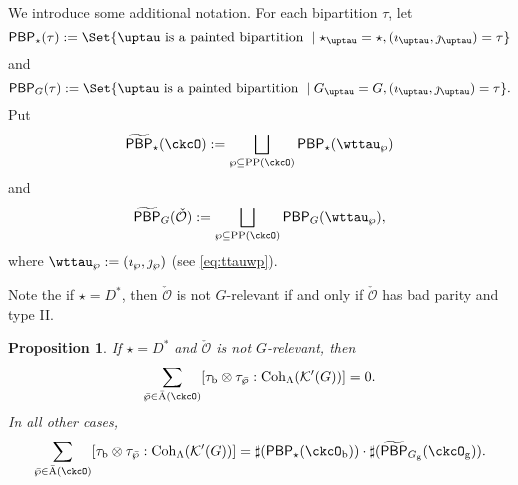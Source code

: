 \documentclass[12pt,a4paper]{amsart}
\newcommand{\CK}{{\mathcal {K}}}
\newcommand{\CO}{{\mathcal {O}}}
\numberwithin{equation}{section}
\newtheorem{prop}[thm]{Proposition}
\theoremstyle{remark}
\def\Unip{\mathrm{Unip}}
\def\LC{{}^{\scriptscriptstyle L}\sC}
\def\Coh{\mathrm{Coh}}
\def\CPP{\mathrm{PP}}
\def\tPBP{\widetilde{\mathsf{PBP}}}
\def\PBP{\mathsf{PBP}}
\def\ckcOg{\ckcO_{\mathrm g}}
\def\nnb{n_{\mathrm b}}
\def\tPBP{\widetilde{\mathsf{PBP}}}
\begin{document}
 We introduce some additional notation. For each bipartition $\tau$, let
\[
  \PBP_{\star}(\tau) := \Set{ \uptau \text{ is a painted bipartition }\mid  \star_{\uptau}=\star, (\imath_{\uptau},\jmath_{\uptau}) = \tau}
\]
and
\[
  \PBP_{G}(\tau) := \Set{\uptau \text{ is a painted bipartition }\mid G_{\uptau}=G, (\imath_{\uptau},\jmath_{\uptau}) = \tau}.
\]
Put
\[
  \tPBP_{\star}(\ckcO) := %
  \bigsqcup_{\wp \subseteq \CPP(\ckcO)}\PBP_{\star}(\wttau_{\wp})
\]
and
\[
  \tPBP_{G}(\check \CO):=   \bigsqcup_{\wp \subseteq \CPP(\ckcO)}\PBP_{G}(\wttau_{\wp}),
 \]
where $\wttau_{\wp} := (\imath_{\wp},\jmath_{\wp})$ (see \eqref{eq:ttauwp}).



Note the if  $\star =D^{*}$, then $\check \CO$ is not $G$-relevant if and only if $\check \CO$ has bad parity and type II.

\begin{prop}\label{prop:countBCD}
 If  $\star =D^{*}$ and $\check \CO$ is not $G$-relevant, then
  \[
  \sum_{\bar \wp\in \bar{\mathrm A}(\ckcO)} [\tau_{\mathrm b}\otimes \tau_{\bar \wp}: \Coh_{\Lambda} (\CK'(G))]=0.
  \]
In all other cases,   %
 \[
 \sum_{\bar \wp\in \bar{\mathrm A}(\ckcO)} [\tau_{\mathrm b}\otimes \tau_{\bar \wp}: \Coh_{\Lambda} (\CK'(G))]=
           \sharp (\PBP_{\star}(\ckcO_{\mathrm b}))\cdot \sharp(\tPBP_{G_{\mathrm g}}(\ckcO_{\mathrm g})).
           \]
 \end{prop}
\end{document}
